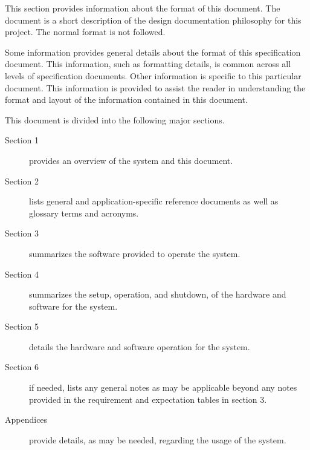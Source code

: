 This section provides information about the format of this document. The document is a short description of the design documentation philosophy for this project.
The normal \SDP format is not followed.

Some information provides general details about the format of this specification document.
This information, such as formatting details, is common across all levels of specification documents.
Other information is specific to this particular document.
This information is provided to assist the reader in understanding the format and layout of the information contained in this document.

This document is divided into the following major sections.
\begin{description}
	\item[Section 1] provides an overview of the system and this document.
	\item[Section 2] lists general and application-specific reference documents as well as glossary terms and acronyms. 
	\item[Section 3] summarizes the software provided to operate the system.
	\item[Section 4] summarizes the setup, operation, and shutdown, of the hardware and software for the system.
	\item[Section 5] details the hardware and software operation for the system.
	\item[Section 6] if needed, lists any general notes as may be applicable beyond any notes provided in the requirement and expectation tables in section 3.
	\item[Appendices] provide details, as may be needed, regarding the usage of the system.
\end{description}